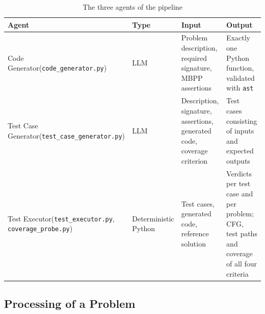 \documentclass[11pt, a4paper]{article}
\begin{document}
\begin{table}[H]
    \centering
    \small
    \begin{tabularx}{\textwidth}{>{\raggedright\arraybackslash}p{3.6cm}>{\raggedright\arraybackslash}p{2.2cm}>{\raggedright\arraybackslash}X>{\raggedright\arraybackslash}X}
        \toprule
        \textbf{Agent} & \textbf{Type} & \textbf{Input} & \textbf{Output} \\
        \midrule
        Code Generator\newline(\texttt{code\_generator.py}) & LLM & Problem description, required signature, MBPP assertions & Exactly one Python function, validated with \texttt{ast} \\
        Test Case Generator\newline(\texttt{test\_case\_generator.py}) & LLM & Description, signature, assertions, generated code, coverage criterion & Test cases consisting of inputs and expected outputs \\
        Test Executor\newline(\texttt{test\_executor.py}, \texttt{coverage\_probe.py}) & Deterministic Python & Test cases, generated code, reference solution & Verdicts per test case and per problem; CFG, test paths and coverage of all four criteria \\
        \bottomrule
    \end{tabularx}
    \caption{The three agents of the pipeline}
\end{table}

\subsection{Processing of a Problem}
\end{document}
